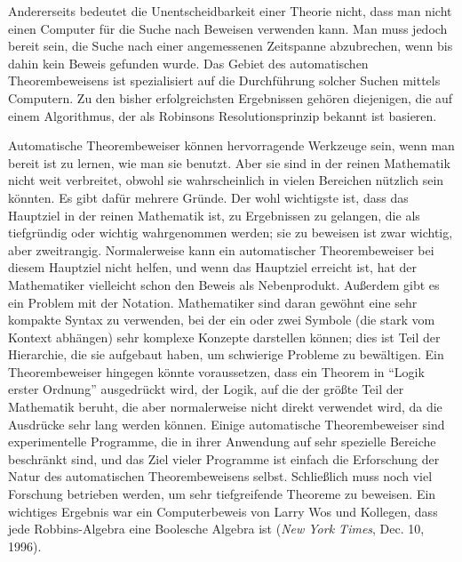 Andererseits bedeutet die Unentscheidbarkeit einer Theorie nicht, dass man nicht einen Computer für die Suche nach Beweisen verwenden kann. Man muss jedoch bereit sein, die Suche nach einer angemessenen Zeitspanne abzubrechen, wenn bis dahin kein Beweis gefunden wurde.  Das Gebiet des automatischen Theorembeweisens ist spezialisiert auf die Durchführung solcher Suchen mittels Computern.  Zu den bisher erfolgreichsten Ergebnissen gehören diejenigen, die auf einem Algorithmus, der als Robinsons Resolutionsprinzip bekannt ist\cite{Robinson} basieren.

Automatische Theorembeweiser können hervorragende Werkzeuge sein, wenn man bereit ist zu lernen, wie man sie benutzt.  Aber sie sind in der reinen Mathematik nicht weit verbreitet, obwohl sie wahrscheinlich in vielen Bereichen nützlich sein könnten.  Es gibt dafür mehrere Gründe.  Der wohl wichtigste ist, dass das Hauptziel in der reinen Mathematik ist, zu Ergebnissen zu gelangen, die als tiefgründig oder wichtig wahrgenommen werden; sie zu beweisen ist zwar wichtig, aber zweitrangig.  Normalerweise kann ein automatischer Theorembeweiser bei diesem Hauptziel nicht helfen, und wenn das Hauptziel erreicht ist, hat der Mathematiker vielleicht schon den Beweis als Nebenprodukt.  Außerdem gibt es ein Problem mit der Notation.  Mathematiker sind daran gewöhnt eine sehr kompakte Syntax zu verwenden, bei der ein oder zwei Symbole (die stark vom Kontext abhängen) sehr komplexe Konzepte darstellen können; dies ist Teil der
Hierarchie, die sie aufgebaut haben, um schwierige Probleme zu bewältigen.  Ein Theorembeweiser hingegen könnte voraussetzen, dass ein Theorem in "`Logik erster Ordnung"' ausgedrückt wird, der Logik, auf die der größte Teil der Mathematik beruht, die aber normalerweise nicht direkt verwendet wird, da die Ausdrücke sehr lang werden können.  Einige automatische Theorembeweiser sind experimentelle Programme, die in ihrer Anwendung auf sehr spezielle Bereiche beschränkt sind, und das Ziel vieler Programme ist einfach die Erforschung der Natur des automatischen Theorembeweisens selbst.  Schließlich muss noch viel Forschung betrieben werden, um sehr tiefgreifende Theoreme zu beweisen.  Ein wichtiges Ergebnis war ein Computerbeweis von Larry Wos und Kollegen, dass jede Robbins-Algebra eine Boolesche Algebra ist ({\em New York Times}, Dec. 10, 1996).
